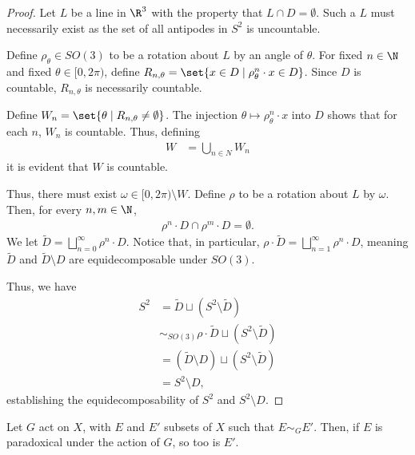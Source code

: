 \documentclass[12pt]{mypackage}
\begin{document}
\begin{proof}
  Let $L$ be a line in $\R^3$ with the property that $L \cap D = \emptyset$. Such a $L$ must necessarily exist as the set of all antipodes in $S^{2}$ is uncountable.\newline

  Define $\rho_{\theta}\in SO(3)$ to be a rotation about $L$ by an angle of $\theta$. For fixed $n\in \N$ and fixed $\theta\in [0,2\pi)$, define $R_{n,\theta} = \set{x\in D\mid \rho_{\theta}^{n}\cdot x\in D}$. Since $D$ is countable, $R_{n,\theta}$ is necessarily countable.\newline

  Define $W_{n} = \set{\theta\mid R_{n,\theta}\neq \emptyset}$. The injection $\theta \mapsto \rho^{n}_{\theta}\cdot x$ into $D$ shows that for each $n$, $W_n$ is countable. Thus, defining
  \begin{align*}
    W &= \bigcup_{n\in N}W_n
  \end{align*}
  it is evident that $W$ is countable.\newline

  Thus, there must exist $\omega \in [0,2\pi)\setminus W$. Define $\rho$ to be a rotation about $L$ by $\omega$. Then, for every $n,m\in \N$,
  \begin{align*}
    \rho^{n}\cdot D \cap \rho^{m}\cdot D = \emptyset.
  \end{align*}
  We let $\tilde{D} = \bigsqcup_{n=0}^{\infty}\rho^{n}\cdot D$. Notice that, in particular, $\rho\cdot\tilde{D} = \bigsqcup_{n=1}^{\infty}\rho^{n}\cdot D$, meaning $\tilde{D}$ and $\tilde{D}\setminus D$ are equidecomposable under $SO(3)$.\newline

  Thus, we have
  \begin{align*}
    S^{2} &= \tilde{D}\sqcup \left(S^2\setminus \tilde{D}\right)\\
          &\sim_{SO(3)} \rho\cdot \tilde{D}\sqcup\left(S^2\setminus \tilde{D}\right)\\
          &= \left(\tilde{D}\setminus D\right)\sqcup\left(S^2\setminus \tilde{D}\right)\\
          &= S^2\setminus D,
  \end{align*}
  establishing the equidecomposability of $S^2$ and $S^2\setminus D$.
\end{proof}
\begin{proposition}
  Let $G$ act on $X$, with $E$ and $E'$ subsets of $X$ such that $E \sim_{G}E'$. Then, if $E$ is paradoxical under the action of $G$, so too is $E'$.
\end{proposition}
\end{document}
